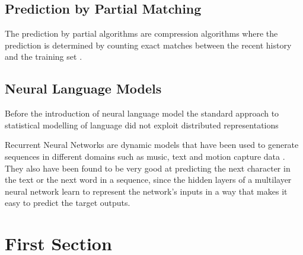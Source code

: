 \subsection{Prediction by Partial Matching}
The prediction by partial algorithms are compression algorithms where the prediction is determined by counting exact matches between the recent history and the training set \cite{graves2013generating}.
    
\subsection{Neural Language Models}
Before the introduction of neural language model the standard approach to statistical modelling of language did not exploit distributed representations\cite{lecun2015deep}

Recurrent Neural Networks are dynamic models that have been used to generate sequences in different domains such as music, text and motion capture data \cite{graves2013generating}.
They also have been found to be very good at predicting the next character in the text or the next word in a sequence, since the hidden layers of a multilayer neural network learn to represent the network’s inputs in a way that makes it easy to predict the target outputs.\cite{lecun2015deep}

\section{First Section}